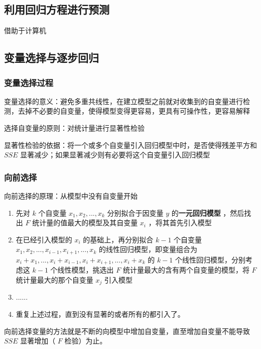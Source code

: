 \documentclass[UTF8,10pt]{book}
\begin{document}
\subsection{利用回归方程进行预测}\label{header-n282}

借助于计算机

\subsection{变量选择与逐步回归}\label{header-n284}

\subsubsection{变量选择过程}\label{header-n285}

变量选择的意义：避免多重共线性，在建立模型之前就对收集到的自变量进行检测，去掉不必要的自变量，使得模型变得更容易，更具有可操作性，更容易解释

选择自变量的原则：对统计量进行显著性检验

显著性检验的依据：将一个或多个自变量引入回归模型中时，是否使得残差平方和
\(SSE\) 显著减少；如果显著减少则有必要将这个自变量引入回归模型

\subsubsection{向前选择}\label{header-n289}

向前选择的原理：从模型中没有自变量开始

\begin{enumerate}
	\def\labelenumi{\arabic{enumi}.}
	\item
	先对 \(k\) 个自变量 \( x_1,x_2,...,x_k\) 分别拟合于因变量 \(y\)
	的\textbf{一元回归模型} ，然后找出 \(F\)
	统计量的值最大的模型及其自变量 \(x_i\) ，将其首先引入模型
	\item
	在已经引入模型的 \(x_i\) 的基础上，再分别拟合 \(k-1\) 个自变量
	\( x_1,x_2,...,x_{i-1},x_{i+1},...,x_{k}\)
	的线性回归模型，即变量组合为
	\(x_i + x_1,...,x_i + x_{i-1},x_i + x_{i+1},...,x_i + x_{k}\) 的
	\(k-1\) 个线性回归模型，分别考虑这 \(k-1\) 个线性模型，挑选出 \(F\)
	统计量最大的含有两个自变量的模型，将 \(F\) 统计量最大的那个自变量
	\(x_j \) 引入模型
	\item
	......
	\item
	重复上述过程，直到没有显著的或者所有的都引入了。
\end{enumerate}

向前选择变量的方法就是不断的向模型中增加自变量，直至增加自变量不能导致
\(SSE\) 显著增加（ \(F\) 检验）为止。
\end{document}
